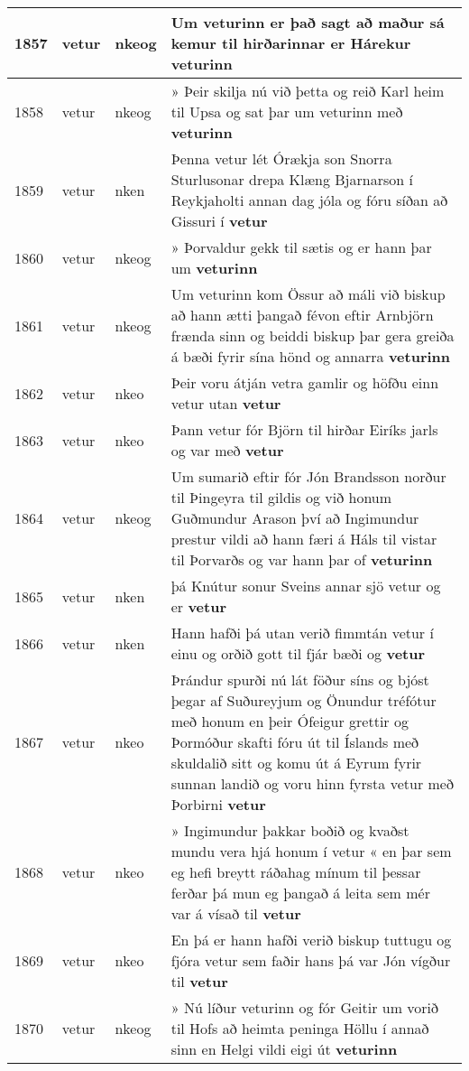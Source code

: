 \documentclass{article}
\begin{document}
\begin{longtable}{p{1cm}|p{1cm}|p{1cm}|p{13cm}}
\hline
1857&vetur&nkeog&Um veturinn er það sagt að maður sá kemur til hirðarinnar er Hárekur \textbf{veturinn} \\
\hline
1858&vetur&nkeog&» Þeir skilja nú við þetta og reið Karl heim til Upsa og sat þar um veturinn með \textbf{veturinn} \\
\hline
1859&vetur&nken&Þenna vetur lét Órækja son Snorra Sturlusonar drepa Klæng Bjarnarson í Reykjaholti annan dag jóla og fóru síðan að Gissuri í \textbf{vetur} \\
\hline
1860&vetur&nkeog&» Þorvaldur gekk til sætis og er hann þar um \textbf{veturinn} \\
\hline
1861&vetur&nkeog&Um veturinn kom Össur að máli við biskup að hann ætti þangað févon eftir Arnbjörn frænda sinn og beiddi biskup þar gera greiða á bæði fyrir sína hönd og annarra \textbf{veturinn} \\
\hline
1862&vetur&nkeo&Þeir voru átján vetra gamlir og höfðu einn vetur utan \textbf{vetur} \\
\hline
1863&vetur&nkeo&Þann vetur fór Björn til hirðar Eiríks jarls og var með \textbf{vetur} \\
\hline
1864&vetur&nkeog&Um sumarið eftir fór Jón Brandsson norður til Þingeyra til gildis og við honum Guðmundur Arason því að Ingimundur prestur vildi að hann færi á Háls til vistar til Þorvarðs og var hann þar of \textbf{veturinn} \\
\hline
1865&vetur&nken&þá Knútur sonur Sveins annar sjö vetur og er \textbf{vetur} \\
\hline
1866&vetur&nken&Hann hafði þá utan verið fimmtán vetur í einu og orðið gott til fjár bæði og \textbf{vetur} \\
\hline
1867&vetur&nkeo&Þrándur spurði nú lát föður síns og bjóst þegar af Suðureyjum og Önundur tréfótur með honum en þeir Ófeigur grettir og Þormóður skafti fóru út til Íslands með skuldalið sitt og komu út á Eyrum fyrir sunnan landið og voru hinn fyrsta vetur með Þorbirni \textbf{vetur} \\
\hline
1868&vetur&nkeo&» Ingimundur þakkar boðið og kvaðst mundu vera hjá honum í vetur « en þar sem eg hefi breytt ráðahag mínum til þessar ferðar þá mun eg þangað á leita sem mér var á vísað til \textbf{vetur} \\
\hline
1869&vetur&nkeo&En þá er hann hafði verið biskup tuttugu og fjóra vetur sem faðir hans þá var Jón vígður til \textbf{vetur} \\
\hline
1870&vetur&nkeog&» Nú líður veturinn og fór Geitir um vorið til Hofs að heimta peninga Höllu í annað sinn en Helgi vildi eigi út \textbf{veturinn} \\

\end{longtable}
\end{document}
